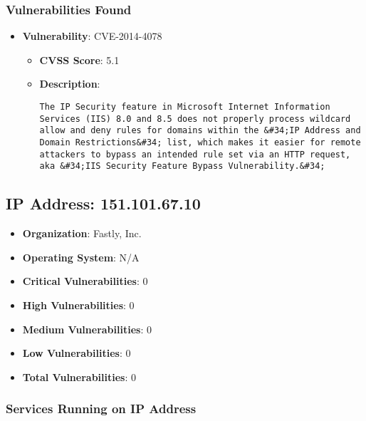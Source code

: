 \documentclass{article}
\begin{document}
\subsubsection*{Vulnerabilities Found}

\begin{itemize}
    
        \item \textbf{Vulnerability}: CVE-2014-4078
        \begin{itemize}
            \item \textbf{CVSS Score}:  5.1 
            \item \textbf{Description}:
            \parbox[t]{0.9\linewidth}{
                \verb|The IP Security feature in Microsoft Internet Information Services (IIS) 8.0 and 8.5 does not properly process wildcard allow and deny rules for domains within the &#34;IP Address and Domain Restrictions&#34; list, which makes it easier for remote attackers to bypass an intended rule set via an HTTP request, aka &#34;IIS Security Feature Bypass Vulnerability.&#34;|
            }
        \end{itemize}
    
\end{itemize}




\clearpage



\subsection*{IP Address: 151.101.67.10}

\begin{itemize}
    \item \textbf{Organization}: Fastly, Inc.
    \item \textbf{Operating System}:  N/A 
    \item \textbf{Critical Vulnerabilities}: 0
    \item \textbf{High Vulnerabilities}: 0
    \item \textbf{Medium Vulnerabilities}: 0
    \item \textbf{Low Vulnerabilities}: 0
    \item \textbf{Total Vulnerabilities}: 0
\end{itemize}

\subsubsection*{Services Running on IP Address}
\end{document}
